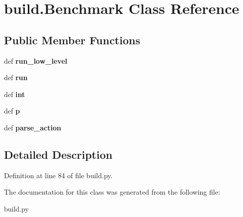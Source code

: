 \hypertarget{classbuild_1_1Benchmark}{\section{build.\-Benchmark \-Class \-Reference}
\label{classbuild_1_1Benchmark}
}
\subsection*{\-Public \-Member \-Functions}
\begin{DoxyCompactItemize}
\item 
\hypertarget{classbuild_1_1Benchmark_aa83f3c52517967b7aaeb6ea896f03feb}{def {\bfseries run\-\_\-low\-\_\-level}}\label{classbuild_1_1Benchmark_aa83f3c52517967b7aaeb6ea896f03feb}

\item 
\hypertarget{classbuild_1_1Benchmark_aaa6c3e07a5f9853f9efa2b8057a1346d}{def {\bfseries run}}\label{classbuild_1_1Benchmark_aaa6c3e07a5f9853f9efa2b8057a1346d}

\item 
\hypertarget{classbuild_1_1Benchmark_a519134bd27acbd705050c16f593bfa82}{def {\bfseries int}}\label{classbuild_1_1Benchmark_a519134bd27acbd705050c16f593bfa82}

\item 
\hypertarget{classbuild_1_1Benchmark_a184359333daaa47e8d2dd22d8065b233}{def {\bfseries p}}\label{classbuild_1_1Benchmark_a184359333daaa47e8d2dd22d8065b233}

\item 
\hypertarget{classbuild_1_1Benchmark_a5b7c8ca2109cdd060640d95f7dab7209}{def {\bfseries parse\-\_\-action}}\label{classbuild_1_1Benchmark_a5b7c8ca2109cdd060640d95f7dab7209}

\end{DoxyCompactItemize}


\subsection{\-Detailed \-Description}


\-Definition at line 84 of file build.\-py.



\-The documentation for this class was generated from the following file\-:\begin{DoxyCompactItemize}
\item 
build.\-py\end{DoxyCompactItemize}
